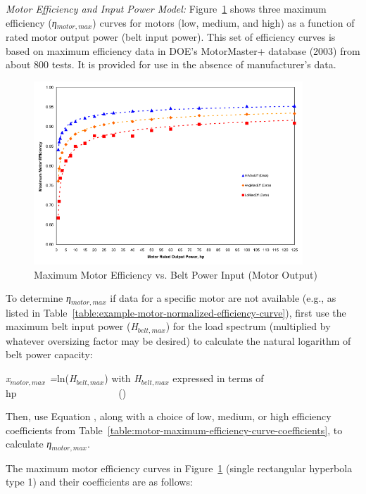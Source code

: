\emph{Motor Efficiency and Input Power Model:} Figure~\ref{fig:maximum-motor-efficiency-vs.-belt-power-input} shows three maximum efficiency (\emph{η\(_{motor,max}\)}) curves for motors (low, medium, and high) as a function of rated motor output power (belt input power). This set of efficiency curves is based on maximum efficiency data in DOE's MotorMaster+ database (2003) from about 800 tests. It is provided for use in the absence of manufacturer's data.

\begin{figure}[hbtp] %
\centering
\includegraphics[width=0.9\textwidth, height=0.9\textheight, keepaspectratio=true]{media/image4917.svg.png}
\caption{Maximum Motor Efficiency vs. Belt Power Input (Motor Output) \protect \label{fig:maximum-motor-efficiency-vs.-belt-power-input}}
\end{figure}

To determine \emph{η\(_{motor,max}\)} if data for a specific motor are not available (e.g., as listed in Table~\ref{table:example-motor-normalized-efficiency-curve}), first use the maximum belt input power (\emph{H\(_{belt,max}\)}) for the load spectrum (multiplied by whatever oversizing factor may be desired) to calculate the natural logarithm of belt power capacity:

\emph{x\(_{motor,max}\) =}ln(\emph{H\(_{belt,max}\)}) with \emph{H\(_{belt,max}\)} expressed in terms of hp~~~~~~~~~~~~~~~~~~~~ ()

Then, use Equation , along with a choice of low, medium, or high efficiency coefficients from Table~\ref{table:motor-maximum-efficiency-curve-coefficients}, to calculate \emph{η\(_{motor,max}\)}.

The maximum motor efficiency curves in Figure~\ref{fig:maximum-motor-efficiency-vs.-belt-power-input} (single rectangular hyperbola type 1) and their coefficients are as follows:

